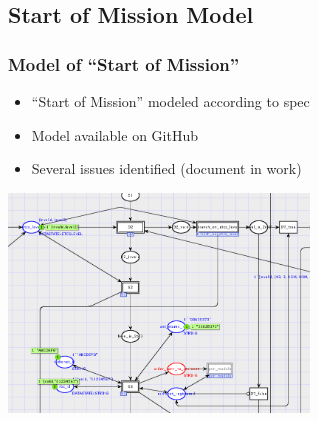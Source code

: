 \documentclass{beamer}
\begin{document}
\subsection{Start of Mission Model}
\begin{frame}
\frametitle{Model of ``Start of Mission''}
\begin{itemize}
\item ``Start of Mission'' modeled according to spec
\item Model available on GitHub
\item Several issues identified (document in work)
\end{itemize}
\includegraphics[width=8cm]{som_excerpt.png}
\end{frame}
\end{document}
